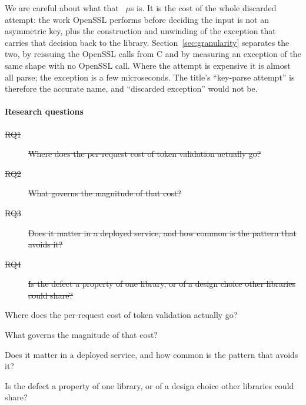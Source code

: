 \documentclass[pdflatex,sn-basic,twocolumn]{sn-jnl}%
\providecommand{\DIFadd}[1]{{\protect\color{blue}\uwave{#1}}} %
\providecommand{\DIFdel}[1]{{\protect\color{red}\sout{#1}}}                      %
\providecommand{\DIFaddbegin}{} %
\providecommand{\DIFaddend}{} %
\providecommand{\DIFdelbegin}{} %
\providecommand{\DIFdelend}{} %
\newcommand{\DIFscaledelfig}{0.5}
\newlength{\DIFdelgraphicswidth} %
\newlength{\DIFdelgraphicsheight} %
\newcommand{\DIFaddincludegraphics}[2][]{{\color{blue}\fbox{\DIFOincludegraphics[#1]{#2}}}} %
\newcommand{\DIFdelincludegraphics}[2][]{%
\sbox{\DIFdelgraphicsbox}{\DIFOincludegraphics[#1]{#2}}%
\settoboxwidth{\DIFdelgraphicswidth}{\DIFdelgraphicsbox} %
\settoboxtotalheight{\DIFdelgraphicsheight}{\DIFdelgraphicsbox} %
\scalebox{\DIFscaledelfig}{%
\parbox[b]{\DIFdelgraphicswidth}{\usebox{\DIFdelgraphicsbox}\\[-\baselineskip] \rule{\DIFdelgraphicswidth}{0em}}\llap{\resizebox{\DIFdelgraphicswidth}{\DIFdelgraphicsheight}{%
\setlength{\unitlength}{\DIFdelgraphicswidth}%
\begin{picture}(1,1)%
\thicklines\linethickness{2pt} %
{\color[rgb]{1,0,0}\put(0,0){\framebox(1,1){}}}%
{\color[rgb]{1,0,0}\put(0,0){\line( 1,1){1}}}%
{\color[rgb]{1,0,0}\put(0,1){\line(1,-1){1}}}%
\end{picture}%
}\hspace*{3pt}}} %
} %
\DeclareRobustCommand{\DIFaddbegin}{\DIFOaddbegin \let\includegraphics\DIFaddincludegraphics} %
\DeclareRobustCommand{\DIFaddend}{\DIFOaddend \let\includegraphics\DIFOincludegraphics} %
\DeclareRobustCommand{\DIFdelbegin}{\DIFOdelbegin \let\includegraphics\DIFdelincludegraphics} %
\DeclareRobustCommand{\DIFdelend}{\DIFOaddend \let\includegraphics\DIFOincludegraphics} %
\begin{document}
We are careful about what that \HostProbeThrows~$\mu$s is. It is the cost of
the whole discarded attempt: the work OpenSSL performs before deciding the
input is not an asymmetric key, plus the construction and unwinding of the
exception that carries that decision back to the library.
Section~\ref{sec:granularity} separates the two, by reissuing the OpenSSL calls
from C and by measuring an exception of the same shape with no OpenSSL call.
Where the attempt is expensive it is almost all parse; the exception is a few
microseconds. The title's ``key-parse attempt'' is therefore the accurate
name, and ``discarded exception'' would not be.

\paragraph{Research questions}
\DIFdelbegin %
\begin{description}%
\item[\DIFdel{RQ1}]%
\DIFdel{Where does the per-request cost of token validation actually go?
}%
\item[\DIFdel{RQ2}]%
\DIFdel{What governs the magnitude of that cost?
}%
\item[\DIFdel{RQ3}]%
\DIFdel{Does it matter in a deployed service, and how common is the pattern
           that avoids it?
}%
\item[\DIFdel{RQ4}]%
\DIFdel{Is the defect a property of one library, or of a design choice other
           libraries could share?
}
\end{description}%
\DIFdelend \DIFaddbegin \begin{list}{}{\setlength{\labelwidth}{2.2em}\setlength{\labelsep}{0.5em}%
  \setlength{\leftmargin}{2.7em}\setlength{\itemsep}{1pt}\setlength{\topsep}{2pt}%
  \setlength{\parsep}{0pt}\renewcommand{\makelabel}[1]{\textbf{#1}\hfill}}
\item[\DIFadd{RQ1}] Where does the per-request cost of token validation actually go?
\item[\DIFadd{RQ2}] What governs the magnitude of that cost?
\item[\DIFadd{RQ3}] Does it matter in a deployed service, and how common is the
  pattern that avoids it?
\item[\DIFadd{RQ4}] Is the defect a property of one library, or of a design choice
  other libraries could share?
\end{list}
\DIFaddend 
\end{document}
